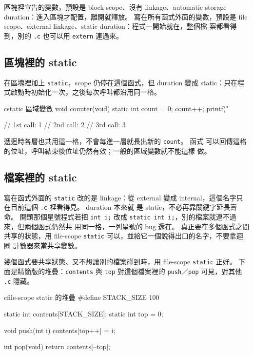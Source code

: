 區塊裡宣告的變數，預設是 block scope、沒有 linkage、automatic storage
duration：進入區塊才配置，離開就釋放。 寫在所有函式外面的變數，預設是
file scope、external linkage、static duration：程式一開始就在，整個檔
案都看得到，別的 \texttt{.c} 也可以用 \texttt{extern} 連過來。

\subsection{區塊裡的 static}

在區塊裡加上 \texttt{static}，scope 仍停在這個函式，但 duration 變成
static：只在程式啟動時初始化一次，之後每次呼叫都沿用同一格。

\begin{code}{c}{static 區域變數}
void counter(void) {
    static int count = 0;
    count++;
    printf("%
}

// 1st call: 1
// 2nd call: 2
// 3rd call: 3
\end{code}

遞迴時各層也共用這一格，不會每進一層就長出新的 \texttt{count}。 函式
可以回傳這格的位址，呼叫結束後位址仍然有效；一般的區域變數就不能這樣
做。

\subsection{檔案裡的 static}

寫在函式外面的 \texttt{static} 改的是 linkage：從 external 變成
internal，這個名字只在目前這個 \texttt{.c} 裡看得見。 duration 本來就
是 static，不必再靠關鍵字延長壽命。 開頭那個星號程式若把 \texttt{int
i;} 改成 \texttt{static int i;}，別的檔案就連不過來，但兩個函式仍然共
用同一格，一列星號的 bug 還在。 真正要在多個函式之間共享的狀態，用
file-scope \texttt{static} 可以，並給它一個說得出口的名字，不要拿迴圈
計數器來當共享變數。

幾個函式要共享狀態、又不想讓別的檔案碰到時，用 file-scope
\texttt{static} 正好。 下面是精簡版的堆疊：\texttt{contents} 與
\texttt{top} 對這個檔案裡的 \texttt{push}／\texttt{pop} 可見，對其他
\texttt{.c} 隱藏。

\begin{code}{c}{file-scope static 的堆疊}
#define STACK_SIZE 100

static int contents[STACK_SIZE];
static int top = 0;

void push(int i) {
    contents[top++] = i;
}

int pop(void) {
    return contents[--top];
}
\end{code}

